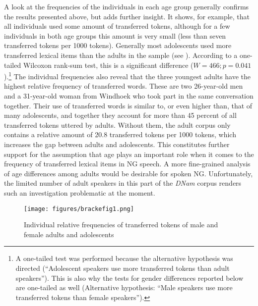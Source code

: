 \documentclass[output=paper]{langsci/langscibook}
\begin{document}
A look at the frequencies of the individuals in each age group generally confirms the results presented above, but adds further insight. It shows, for example, that all individuals used some amount of transferred tokens, although for a few individuals in both age groups this amount is very small (less than seven transferred tokens per 1000 tokens). Generally most adolescents used more transferred lexical items than the adults in the sample (see ). According to a one-tailed Wilcoxon rank-sum test, this is a significant difference ($W = 466; p = 0.041$).\footnote{A one-tailed test was performed because the alternative hypothesis was directed (“Adolescent speakers use more transferred tokens than adult speakers”). This is also why the tests for gender differences reported below are one-tailed as well (Alternative hypothesis: “Male speakers use more transferred tokens than female speakers”).} The individual frequencies also reveal that the three youngest adults have the highest relative frequency of transferred words. These are two 26-year-old men and a 31-year-old woman from Windhoek who took part in the same conversation together. Their use of transferred words is similar to, or even higher than, that of many adolescents, and together they account for more than 45 percent of all transferred tokens uttered by adults. Without them, the adult corpus only contains a relative amount of 20.8 transferred tokens per 1000 tokens, which increases the gap between adults and adolescents. This constitutes further support for the assumption that age plays an important role when it comes to the frequency of transferred lexical items in NG speech. A more fine-grained analysis of age differences among adults would be desirable for spoken NG. Unfortunately, the limited number of adult speakers in this part of the \textit{DNam} corpus renders such an investigation problematic at the moment.

\begin{figure}
\texttt{[image: figures/brackefig1.png]}
\caption{Individual relative frequencies of transferred tokens of male and female adults and adolescents\label{fig:bracke:1}}
\end{figure}
\end{document}
